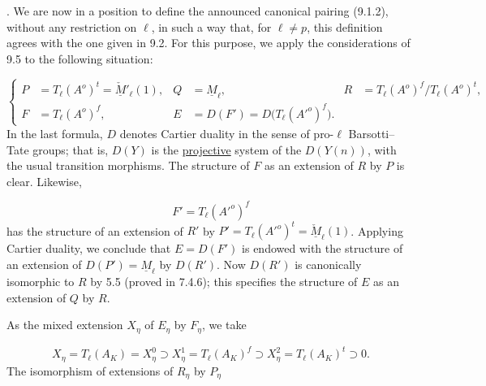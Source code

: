 
\medskip
{}. We are now in a position to define the announced canonical pairing
(9.1.2), without any restriction on $\ell$, in such a way that, for
$\ell\neq p$, this definition agrees with the one given in 9.2. For this
purpose, we apply the considerations of 9.5 to the following situation:

\begin{equation}\tag{9.6.1}
\left\{
\begin{aligned}
P&=T_\ell(A^o)^t=\check{\underline M}{}'_\ell(1),
& Q&=\underline M_\ell,
& R&=T_\ell(A^o)^f/T_\ell(A^o)^t,\\[1.25ex]
F&=T_\ell(A^o)^f,
& E&=D(F')=D\bigl(T_\ell({A'}^o)^f\bigr).
\end{aligned}
\right.
\end{equation}
In the last formula, $D$ denotes Cartier duality in the sense of
pro-$\ell$ Barsotti--Tate groups; that is, $D(Y)$ is the
\underline{projective} system of the $D(Y(n))$, with the usual transition
morphisms. The structure of $F$ as an extension of $R$ by $P$ is clear.
Likewise,

\begin{equation*}
F'=T_\ell({A'}^o)^f
\end{equation*}
has the structure of an extension of $R'$ by
$P'=T_\ell({A'}^o)^t=\check{\underline M}_\ell(1)$. Applying Cartier
duality, we conclude that $E=D(F')$ is endowed with the structure of an
extension of $D(P')=\underline M_\ell$ by $D(R')$. Now $D(R')$ is
canonically isomorphic to $R$ by 5.5 (proved in 7.4.6); this specifies the
structure of $E$ as an extension of $Q$ by $R$.

As the mixed extension $X_\eta$ of $E_\eta$ by $F_\eta$, we take

\begin{equation}\tag{9.6.2}
X_\eta=T_\ell(A_K)=X^0_\eta
 \supset X^1_\eta=T_\ell(A_K)^f
 \supset X^2_\eta=T_\ell(A_K)^t
 \supset0.
\end{equation}
The isomorphism of extensions of $R_\eta$ by $P_\eta$

